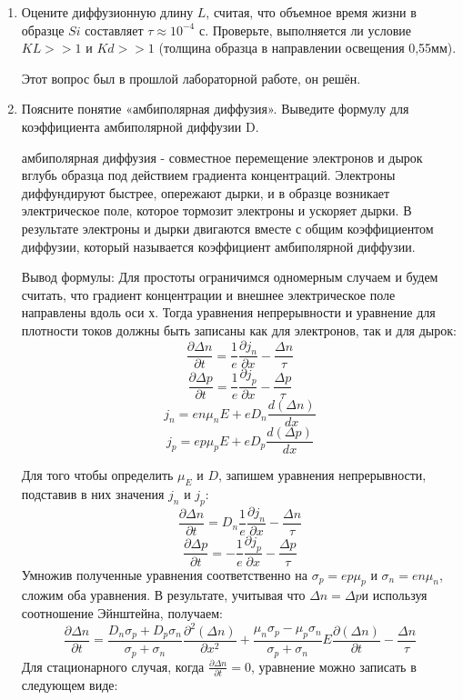\documentclass[a4paper, 12pt]{article}
\begin{document}
\begin{enumerate}
    \item Оцените диффузионную длину $L$, считая, что объемное время жизни в образце $Si$ составляет
 $\tau\approx 10^{-4}$ с. Проверьте, выполняется ли условие $KL>>1$ и $Kd>>1$ (толщина образца в направлении  освещения 0,55мм).\par
 Этот вопрос был в прошлой лабораторной работе, он решён.
    \item Поясните понятие «амбиполярная диффузия». Выведите формулу для коэффициента амбиполярной диффузии D.\par
    амбиполярная диффузия - совместное перемещение электронов и дырок вглубь образца под действием градиента концентраций. Электроны диффундируют быстрее, опережают дырки, и в образце возникает электрическое поле, которое тормозит электроны и ускоряет дырки. В результате электроны и дырки двигаются вместе с общим коэффициентом диффузии, который называется коэффициент амбиполярной диффузии.\par
    Вывод формулы: Для простоты ограничимся одномерным случаем и будем считать, что градиент концентрации и внешнее электрическое поле направлены вдоль оси х. Тогда уравнения непрерывности и уравнение для плотности токов должны быть записаны как для электронов, так и для дырок:
    \[
    \frac{\partial\Delta n}{\partial t}= \frac{1}{e}\frac{\partial j_n}{\partial x} - \frac{\Delta n}{\tau}
    \]
    \[
    \frac{\partial\Delta p}{\partial t}= \frac{1}{e}\frac{\partial j_p}{\partial x} - \frac{\Delta p}{\tau}
    \]
    \[
    j_n = en\mu_n E + eD_n\frac{d(\Delta n)}{dx}
    \]
      \[
    j_p = ep\mu_p E + eD_p\frac{d(\Delta p)}{dx}
    \]
    \par
    Для того чтобы определить $\mu_E$ и $D$, запишем уравнения непрерывности, подставив в них значения $j_n$ и $j_p$:
    \[
    \frac{\partial\Delta n}{\partial t}= D_n\frac{1}{e}\frac{\partial j_n}{\partial x} - \frac{\Delta n}{\tau}
    \]
    \[
    \frac{\partial\Delta p}{\partial t}=- \frac{1}{e}\frac{\partial j_p}{\partial x} - \frac{\Delta p}{\tau}
    \]
    Умножив полученные уравнения соответственно на $\sigma_p = ep\mu_p$ и $\sigma_n = en\mu_n$, сложим оба уравнения. В результате, учитывая что $\Delta n =\Delta p$и используя соотношение Эйнштейна, получаем:
    \[
    \frac{\partial\Delta n}{\partial t}= \frac{D_n \sigma_p +D_p \sigma_n}{\sigma_p + \sigma_n} \frac{\partial^2(\Delta n)}{\partial x^2} +\frac{\mu_n \sigma_p - \mu_p \sigma_n}{\sigma_p +\sigma_n}E\frac{\partial(\Delta n)}{\partial t} - \frac{\Delta n}{\tau}    \]
    Для стационарного случая, когда $\frac{\partial\Delta n}{\partial t} = 0$, уравнение можно записать в следующем виде:

\end{enumerate}
\end{document}
